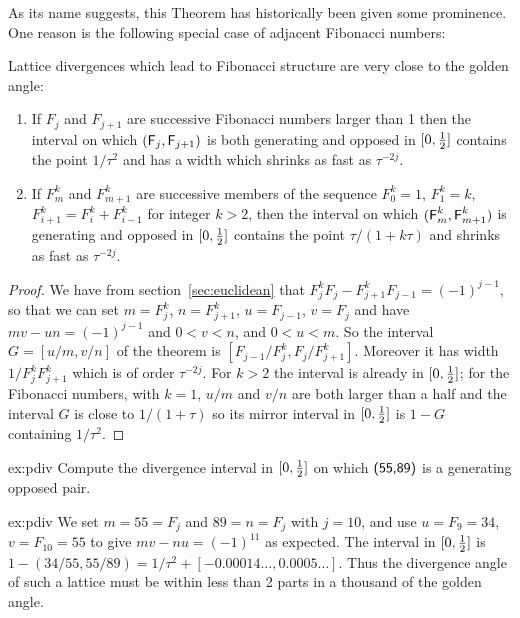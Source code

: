 \clearpage
%
As its name suggests, this Theorem has historically been given some prominence. One reason is the following special case of adjacent Fibonacci numbers:
\begin{theorem}
	Lattice divergences which lead to Fibonacci structure are very close to the golden angle:
	\begin{enumerate}
\item
	If $F_j$ and $F_{j+1}$ are successive Fibonacci numbers larger than 1 then the interval on which $({\textsf F}_j,{\textsf F}_{j+1})$ is both generating and opposed in $[0,\textstyle{\frac{1}{2}}]$  contains the point $1/\tau^2$ and has a width 
	 which shrinks as fast as $\tau^{-2j}$.
\item 
If $F^k_m$ and $F^k_{m+1}$ are successive members of the sequence $F^k_0=1$, $F^k_1=k$, $F^k_{i+1}=F^k_i+F^k_{i-1}$ for integer $k>2$, then 
	the interval on which $({\textsf F}^k_m,{\textsf F}^k_{m+1})$ is generating and opposed in  $[0,\textstyle{\frac{1}{2}}]$ contains the point $\tau/(1+k\tau)$ and shrinks as fast as  $\tau^{-2j}$.
\end{enumerate}
\end{theorem}
\begin{proof}
	We have from section~\ref{sec:euclidean} that $F^{k}_j F_j-F^{k}_{j+1}F_{j-1}=(-1)^{j-1}$, so that we can set $m=F^{k}_j$, $n=F^{k}_{j+1}$, $u=F_{j-1}$, $v=F_{j}$ and have $mv-un=(-1)^{j-1}$ and $0<v<n$, and $0<u<m$. 
	So the interval $G=[u/m,v/n]$ of the theorem is $[F_{j-1}/F^k_{j},F_j/F^k_{j+1}]$.
	Moreover it has width $1/F^k_jF^{k}_{j+1}$ which is of order $\tau^{-2j}$.
	For $k>2$ the interval is already in $[0,\textstyle{\frac{1}{2}}]$; for the Fibonacci numbers, with $k=1$, $u/m$ and $v/n$ are both larger than a half and the interval $G$ is close to $1/(1+\tau)$ so its mirror 
	 interval in $[0,\textstyle{\frac{1}{2}}]$ is  
	$1-G$ containing $1/\tau^2$. 
\end{proof}
\begin{jExercise}{ex:pdiv}
	Compute the divergence interval in $[0,\textstyle{\frac{1}{2}}]$ on which  $\textsf{(55,89)}$ is a generating opposed pair.
\end{jExercise}
\begin{jAnswer}{ex:pdiv}
	We set $m=55=F_j$ and $89=n=F_j$ with $j=10$, and use $u=F_9=34$, $v=F_{10}=55$ to give $mv-nu=(-1)^{11}$ as expected.
	The interval in $[0,\textstyle{\frac{1}{2}}]$ is $1-(34/55,55/89)= 1/\tau^2+ [-0.00014\ldots, 0.0005\ldots]$.
	Thus the divergence angle of such a lattice must be within less than 2 parts in a thousand of the golden angle. 
\end{jAnswer}

